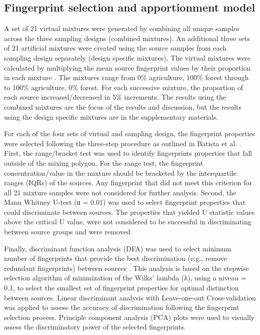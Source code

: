 \documentclass[
  number]{elsarticle}
\begin{document}
\subsection{Fingerprint selection and apportionment
model}\label{fingerprint-selection-and-apportionment-model}

A set of 21 virtual mixtures were generated by combining all unique
samples across the three sampling designs (combined mixtures). An
additional three sets of 21 artificial mixtures were created using the
source samples from each sampling design separately (design specific
mixtures). The virtual mixtures were calculated by multiplying the mean
source fingerprint values by their proportion in each mixture
\citep{batista2022}. The mixtures range from 0\% agriculture, 100\%
forest through to 100\% agriculture, 0\% forest. For each successive
mixture, the proportion of each source increased/decreased in 5\%
increments. The results using the combined mixtures are the focus of the
results and discussion, but the results using the design specific
mixtures are in the supplementary materials.

For each of the four sets of virtual and sampling design, the
fingerprint properties were selected following the three-step procedure
as outlined in Batista et al. \citep{batista2022}. First, the
range/bracket test was used to identify fingerprints properties that
fall outside of the mixing polygon. For the range test, the fingerprint
concentration/value in the mixture should be bracketed by the
interquartile ranges (IQRs) of the sources. Any fingerprint that did not
meet this criterion for all 21 mixture samples were not considered for
further analysis. Second, the Mann Whitney U-test (ɑ = 0.01) was used to
select fingerprint properties that could discriminate between sources.
The properties that yielded U statistic values above the critical U
value, were not considered to be successful in discriminating between
source groups and were removed.

Finally, discriminant function analysis (DFA) \citep[klaR v
1.7-0][]{weihs2005} was used to select minimum number of fingerprints
that provide the best discrimination (e.g., remove redundant
fingerprints) between sources \citep{collins1997}. This analysis is
based on the stepwise selection algorithm of minimization of the Wilks'
lambda (λ), using a niveau = 0.1, to select the smallest set of
fingerprint properties for optimal distinction between sources. Linear
discriminant analysis with Leave-one-out Cross-validation was applied to
assess the accuracy of discrimination following the fingerprint
selection process. Principle component analysis (PCA) plots were used to
visually assess the discriminatory power of the selected fingerprints.
\end{document}
